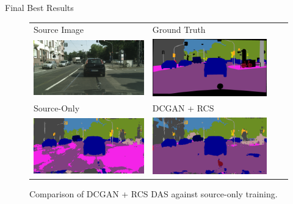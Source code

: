 \documentclass{lib/curtin_format}
\begin{document}
\begin{frame}{Final Best Results}
    \begin{figure}[]
        \centering
        \begin{tabular}{llll}
            Source Image                                                              & Ground Truth                                                               \\
            \includegraphics[width=.4\linewidth]{res/das-qualitative/image.png}       & \includegraphics[width=.4\linewidth]{res/das-qualitative/ground-truth.png} \\
            Source-Only                                                               & DCGAN + RCS                                                                \\
            \includegraphics[width=.4\linewidth]{res/das-qualitative/source-only.png} & \includegraphics[width=.4\linewidth]{res/das-qualitative/dcgan-rcs.png}    \\
        \end{tabular}
        \caption{Comparison of DCGAN + RCS DAS against source-only training.}
        \label{fig:das-qualitative}
    \end{figure}
\end{frame}
\end{document}
